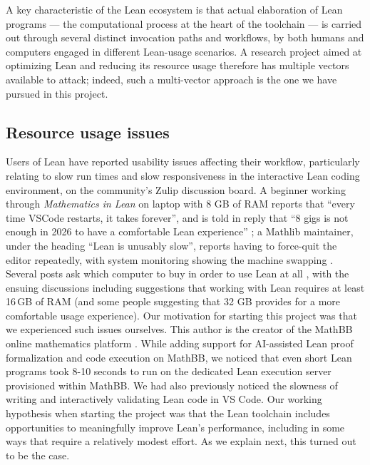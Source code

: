 \documentclass{article}
\newcommand{\Lean}{Lean\xspace}      %
\newcommand{\mathlib}{Mathlib\xspace}
\begin{document}
A key characteristic of the \Lean ecosystem is that actual elaboration of \Lean programs --- the computational process at the heart of the toolchain --- is carried out through several distinct invocation paths and workflows, by both humans and computers engaged in different \Lean-usage scenarios. A research project aimed at optimizing \Lean and reducing its resource usage therefore has multiple vectors available to attack; indeed, such a multi-vector approach is the one we have pursued in this project.

\subsection{Resource usage issues}

Users of \Lean have reported usability issues affecting their workflow, particularly relating to slow run times and slow responsiveness in the interactive \Lean coding environment, on the community's Zulip discussion board. A beginner working through \emph{Mathematics in Lean} on laptop with 8 GB of RAM reports that ``every time VSCode restarts, it takes forever'', and is told in reply that ``8 gigs is not enough in 2026 to have a comfortable \Lean experience'' \cite{zulip-vscode-startup}; a \mathlib maintainer, under the heading ``\Lean is unusably slow'', reports having to force-quit the editor repeatedly, with system monitoring showing the machine swapping \cite{zulip-unusably-slow}. Several posts ask which computer to buy in order to use \Lean at all \cite{zulip-hardware,zulip-laptops,zulip-computer}, with the ensuing discussions including suggestions that working with \Lean requires at least 16\,GB of RAM (and some people suggesting that 32 GB provides for a more comfortable usage experience). Our motivation for starting this project was that we experienced such issues ourselves. This author is the creator of the MathBB online mathematics platform \cite{mathbb}. While adding support for AI-assisted \Lean proof formalization and code execution on MathBB, we noticed that even short \Lean programs took 8-10 seconds to run on the dedicated \Lean execution server provisioned within MathBB. We had also previously noticed the slowness of writing and interactively validating \Lean code in VS Code. Our working hypothesis when starting the project was that the \Lean toolchain includes opportunities to meaningfully improve \Lean's performance, including in some ways that require a relatively modest effort. As we explain next, this turned out to be the case.
\end{document}
